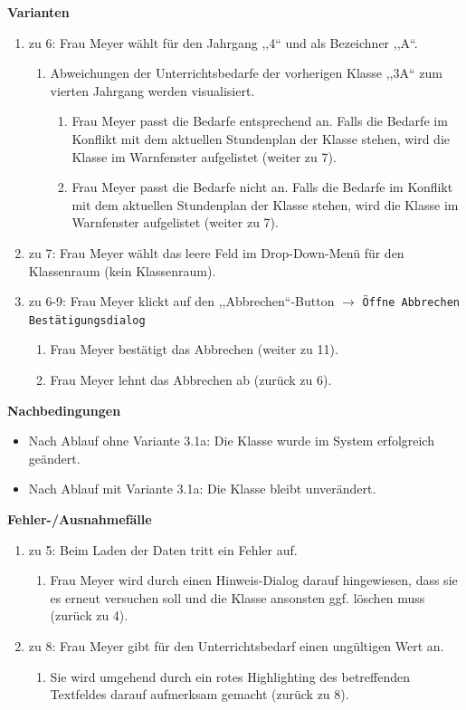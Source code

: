 \documentclass[fontsize=12pt,paper=a4,twoside]{scrartcl}
\begin{document}
\textbf{Varianten}
\begin{enumerate}
\item zu 6: Frau Meyer wählt für den Jahrgang ,,4`` und als Bezeichner ,,A``.
	\begin{enumerate}[label=\arabic*.]
	\item Abweichungen der Unterrichtsbedarfe der vorherigen Klasse ,,3A`` zum vierten Jahrgang werden visualisiert. 
		\begin{enumerate}[label=\alph*.]
		\item Frau Meyer passt die Bedarfe entsprechend an. Falls die Bedarfe im Konflikt mit dem aktuellen Stundenplan der Klasse stehen, wird die Klasse im Warnfenster aufgelistet (weiter zu 7).
		\item Frau Meyer passt die Bedarfe nicht an. Falls die Bedarfe im Konflikt mit dem aktuellen Stundenplan der Klasse stehen, wird die Klasse im Warnfenster aufgelistet (weiter zu 7).
		\end{enumerate}
	\end{enumerate}
\item zu 7: Frau Meyer wählt das leere Feld im Drop-Down-Menü für den Klassenraum (kein Klassenraum).
\item zu 6-9: Frau Meyer klickt auf den ,,Abbrechen``-Button $\rightarrow$ \texttt{Öffne Abbrechen Bestätigungsdialog}
	\begin{enumerate}[label={\alph*.}]
	\item Frau Meyer bestätigt das Abbrechen (weiter zu 11).
	\item Frau Meyer lehnt das Abbrechen ab (zurück zu 6).
	\end{enumerate}
\end{enumerate}
\vspace{5pt}


\textbf{Nachbedingungen}
\begin{itemize}
\item Nach Ablauf ohne Variante 3.1a: Die Klasse wurde im System erfolgreich geändert.
\item Nach Ablauf mit Variante 3.1a: Die Klasse bleibt unverändert.
\end{itemize}
\vspace{5pt}


\textbf{Fehler-/Ausnahmefälle}
\begin{enumerate}
\item zu 5: Beim Laden der Daten tritt ein Fehler auf.
	\begin{enumerate}[label=\arabic*.]
	\item Frau Meyer wird durch einen Hinweis-Dialog darauf hingewiesen, dass sie es erneut versuchen soll und die Klasse ansonsten ggf. löschen muss (zurück zu 4).
	\end{enumerate}
\item zu 8: Frau Meyer gibt für den Unterrichtsbedarf einen ungültigen Wert an.
		\begin{enumerate}[label={\arabic*.}]
		\item Sie wird umgehend durch ein rotes Highlighting des betreffenden Textfeldes darauf aufmerksam gemacht (zurück zu 8).
		\end{enumerate}
\end{enumerate}
\end{document}
